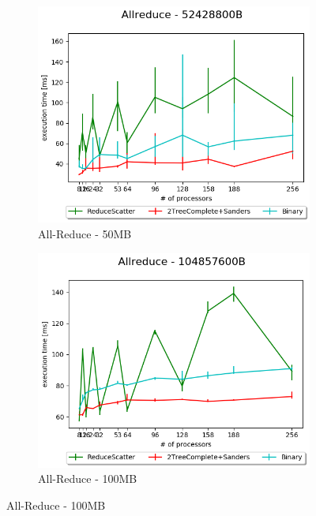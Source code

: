 \documentclass[sigplan,review,anonymous]{acmart}\settopmatter{printfolios=true,printccs=false,printacmref=false}
\begin{document}
\begin{figure}
\centering
\begin{subfigure}{.25\textwidth}
  \centering
  \includegraphics[width=1\linewidth]{images/Results/AllReduce/AllReduceComp2_52428800B.png}
  \caption{All-Reduce - 50MB}
  \label{reduce-selected-5MB}
\end{subfigure}%
\begin{subfigure}{.25\textwidth}
  \centering
  \includegraphics[width=1\linewidth]{images/Results/AllReduce/AllReduceComp2_104857600B.png}
  \caption{All-Reduce - 100MB}
  \label{reduce-selected-7MB}
\end{subfigure}

\end{figure}
\end{document}
